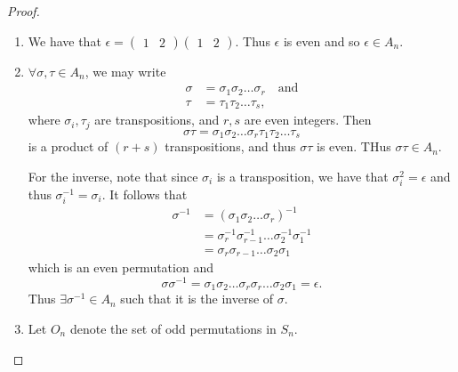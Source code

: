 \documentclass[notoc,notitlepage]{tufte-book}
\begin{document}
\begin{proof}
  \begin{enumerate}
    \item We have that $\epsilon = \begin{pmatrix} 1 & 2 \end{pmatrix} \begin{pmatrix} 1 & 2 \end{pmatrix}$. Thus $\epsilon$ is even and so $\epsilon \in A_n$.
    \item $\forall \sigma, \tau \in A_n$, we may write
      \begin{align*}
        \sigma &= \sigma_1 \sigma_2 \hdots \sigma_r \quad \text{and} \\
        \tau   &= \tau_1 \tau_2 \hdots \tau_s,
      \end{align*}
      where $\sigma_i, \tau_j$ are transpositions, and $r, s$ are even integers. Then
      \begin{equation*}
        \sigma \tau = \sigma_1 \sigma_2 \hdots \sigma_r \tau_1 \tau_2 \hdots \tau_s
      \end{equation*}
      is a product of $(r + s)$ transpositions, and thus $\sigma \tau$ is even. THus $\sigma \tau \in A_n$.

      For the inverse, note that since $\sigma_i$ is a transposition, we have that $\sigma_i^2 = \epsilon$ and thus $\sigma_i^{-1} = \sigma_i$. It follows that
      \begin{align*}
        \sigma^{-1} &= (\sigma_1 \sigma_2 \hdots \sigma_r)^{-1} \\
          &= \sigma_r^{-1} \sigma_{r - 1}^{-1} \hdots \sigma_2^{-1} \sigma_1^{-1} \\
          &= \sigma_r \sigma_{r - 1} \hdots \sigma_2 \sigma_1
      \end{align*}
      which is an even permutation and
      \begin{equation*}
        \sigma \sigma^{-1} = \sigma_1 \sigma_2 \hdots \sigma_r \sigma_r \hdots \sigma_2 \sigma_1 = \epsilon.
      \end{equation*}
      Thus $\exists \sigma^{-1} \in A_n$ such that it is the inverse of $\sigma$.
    \item Let $O_n$ denote the set of odd permutations in $S_n$.
\end{enumerate}
\end{proof}
\end{document}
